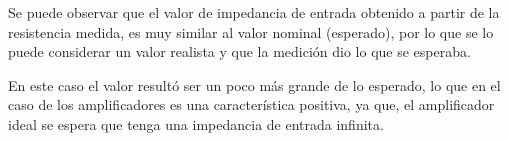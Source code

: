 
\begin{table}[H]
    \centering
        \def\tablename{Tabla} 
        \caption{Valores esperados y obtenidos}
        \label{tab:exp2}
\end{table}

Se puede observar que el valor de impedancia de entrada obtenido a partir de la resistencia medida, es muy similar al valor nominal (esperado), por lo que se lo puede considerar un valor realista y que la medición dio lo que se esperaba. 

En este caso el valor resultó ser un poco más grande de lo esperado, lo que en el caso de los amplificadores es una característica positiva, ya que, el amplificador ideal se espera que tenga una impedancia de entrada infinita.